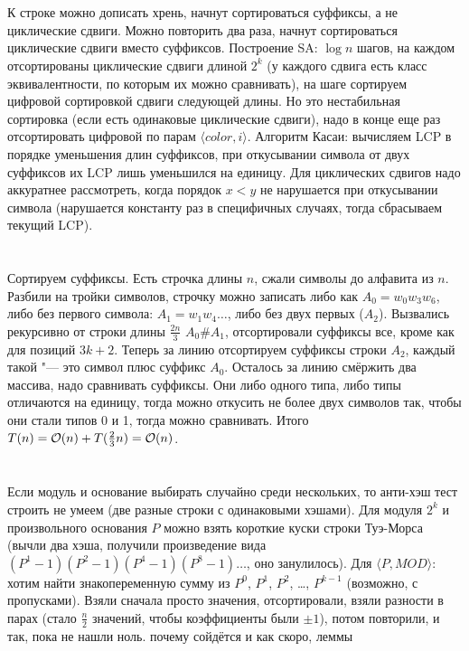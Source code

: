 \section{} %
К строке можно дописать хрень, начнут сортироваться суффиксы, а не циклические сдвиги.
Можно повторить два раза, начнут сортироваться циклические сдвиги вместо суффиксов.
Построение SA: $\log n$ шагов, на каждом отсортированы циклические сдвиги длиной $2^k$ (у каждого сдвига есть класс эквивалентности, по которым их можно сравнивать), на шаге сортируем цифровой сортировкой сдвиги следующей длины.
Но это нестабильная сортировка (если есть одинаковые циклические сдвиги), надо в конце еще раз отсортировать цифровой по парам $\langle color, i \rangle$.
Алгоритм Касаи: вычисляем LCP в порядке уменьшения длин суффиксов, при откусывании символа от двух суффиксов их LCP лишь уменьшился на единицу.
Для циклических сдвигов надо аккуратнее рассмотреть, когда порядок $x<y$ не нарушается при откусывании символа (нарушается константу раз в специфичных случаях, тогда сбрасываем текущий LCP).

\section{} %
Сортируем суффиксы.
Есть строчка длины $n$, сжали символы до алфавита из $n$.
Разбили на тройки символов, строчку можно записать либо как $A_0=w_0w_3w_6$, либо без первого символа: $A_1=w_1w_4\dots$, либо без двух первых ($A_2$).
Вызвались рекурсивно от строки длины $\frac{2n}{3}$ \t{$A_0$\#$A_1$}, отсортировали суффиксы все, кроме как для позиций $3k+2$.
Теперь за линию отсортируем суффиксы строки $A_2$, каждый такой "--- это символ плюс суффикс $A_0$.
Осталось за линию смёржить два массива, надо сравнивать суффиксы.
Они либо одного типа, либо типы отличаются на единицу, тогда можно откусить не более двух символов так, чтобы они стали типов 0 и 1, тогда можно сравнивать.
Итого $T(n) = \mathcal{O}(n) + T(\frac23 n) = \mathcal{O}(n)$.

\section{} %
Если модуль и основание выбирать случайно среди нескольких, то анти-хэш тест строить не умеем (две разные строки с одинаковыми хэшами).
Для модуля $2^k$ и произвольного основания $P$ можно взять короткие куски строки Туэ-Морса (вычли два хэша, получили произведение вида $(P^1-1)(P^2-1)(P^4-1)(P^8-1)\dots$, оно занулилось).
Для $\langle P, MOD \rangle$: хотим найти знакопеременную сумму из $P^0$, $P^1$, $P^2$, \dots, $P^{k-1}$ (возможно, с пропусками).
Взяли сначала просто значения, отсортировали, взяли разности в парах (стало $\frac n 2$ значений, чтобы коэффициенты были $\pm 1$), потом повторили, и так, пока не нашли ноль.
\TODO почему сойдётся и как скоро, леммы

